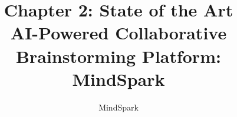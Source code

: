 \documentclass[11pt,a4paper]{report}
\begin{document}
\title{\textbf{\color{PrimaryNavy}Chapter 2: State of the Art}\\[6pt]\Large\color{SlateGray}AI-Powered Collaborative Brainstorming Platform: MindSpark}
\author{MindSpark}
\date{}
\maketitle

\tableofcontents
\clearpage

\setcounter{chapter}{1}





\end{document}
